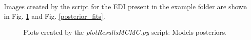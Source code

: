 \documentclass[]{scrartcl}
\begin{document}
	Images created by the script for the EDI present in the example folder are shown in Fig. \ref{posterior_models} and Fig. \ref{posterior_fits}.
	
	
	\begin{figure}
		\centering
		\caption{Plots created by the \textit{plotResultsMCMC.py} script: Models posteriors.}
		\label{posterior_models}
	\end{figure}
	
\end{document}
